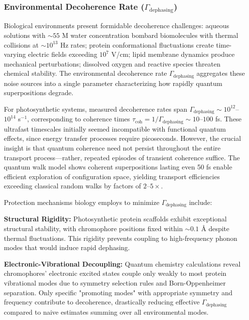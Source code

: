 \documentclass[11pt,a4paper,twoside]{article}
\begin{document}
\subsubsection{Environmental Decoherence Rate ($\Gamma_{\text{dephasing}}$)}

Biological environments present formidable decoherence challenges: aqueous solutions with $\sim 55$ M water concentration bombard biomolecules with thermal collisions at $\sim 10^{13}$ Hz rates; protein conformational fluctuations create time-varying electric fields exceeding $10^7$ V/cm; lipid membrane dynamics produce mechanical perturbations; dissolved oxygen and reactive species threaten chemical stability. The environmental decoherence rate $\Gamma_{\text{dephasing}}$ aggregates these noise sources into a single parameter characterizing how rapidly quantum superpositions degrade.

For photosynthetic systems, measured decoherence rates span $\Gamma_{\text{dephasing}} \sim 10^{12}$--$10^{14}$ s$^{-1}$, corresponding to coherence times $\tau_{\text{coh}} = 1/\Gamma_{\text{dephasing}} \sim 10$--$100$ fs. These ultrafast timescales initially seemed incompatible with functional quantum effects, since energy transfer processes require picoseconds. However, the crucial insight is that quantum coherence need not persist throughout the entire transport process---rather, repeated episodes of transient coherence suffice. The quantum walk model shows coherent superpositions lasting even 50 fs enable efficient exploration of configuration space, yielding transport efficiencies exceeding classical random walks by factors of $2$--$5\times$.

Protection mechanisms biology employs to minimize $\Gamma_{\text{dephasing}}$ include:

\textbf{Structural Rigidity:} Photosynthetic protein scaffolds exhibit exceptional structural stability, with chromophore positions fixed within $\sim 0.1$ Å despite thermal fluctuations. This rigidity prevents coupling to high-frequency phonon modes that would induce rapid dephasing.

\textbf{Electronic-Vibrational Decoupling:} Quantum chemistry calculations reveal chromophores' electronic excited states couple only weakly to most protein vibrational modes due to symmetry selection rules and Born-Oppenheimer separation. Only specific "promoting modes" with appropriate symmetry and frequency contribute to decoherence, drastically reducing effective $\Gamma_{\text{dephasing}}$ compared to naive estimates summing over all environmental modes.
\end{document}
